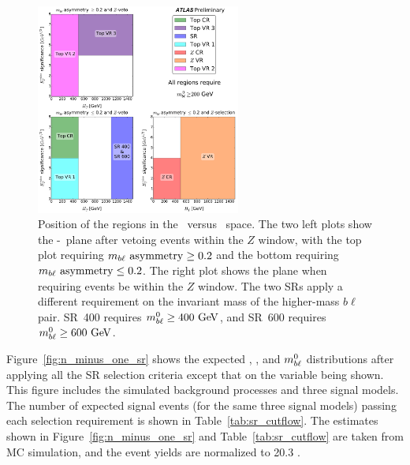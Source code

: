 \begin{figure}[ht]
  \centering
  \includegraphics[width=0.6\textwidth]{figs/blstop/regions__met_sig__ht_plane.pdf}
  \caption{Position of the regions in the \METSIG\ versus \HT\ space.
    The two left plots show the \METSIG-\HT~plane after vetoing events within
    the $Z$ window, with the top plot requiring $m_{b\ell}~\mathrm{asymmetry} \geq 0.2$ and the
    bottom requiring $m_{b\ell}~\mathrm{asymmetry} \leq 0.2$.
    The right plot shows the plane when requiring events be within the $Z$
    window.
    The two SRs apply a different requirement on the
    invariant mass of the higher-mass $b\ell$ pair. SR~400 requires
    $\MBL^{0} \geq 400 \GeV$, and SR~600 requires $\MBL^{0} \geq 600 \GeV$.
  }
  \label{fig:region_coverage}
\end{figure}

Figure~\ref{fig:n_minus_one_sr} shows the expected \HT, \MBLASYM, and $m_{b\ell}^0$
distributions after applying all the SR selection criteria except that on the
variable being shown.
This figure includes the simulated background processes and three signal models.
The number of expected signal events (for the same three signal models)
passing each selection requirement is shown in Table~\ref{tab:sr_cutflow}.
The estimates shown in Figure~\ref{fig:n_minus_one_sr} and
Table~\ref{tab:sr_cutflow} are taken from MC simulation, and the event
yields are normalized to 20.3 \ifb.

